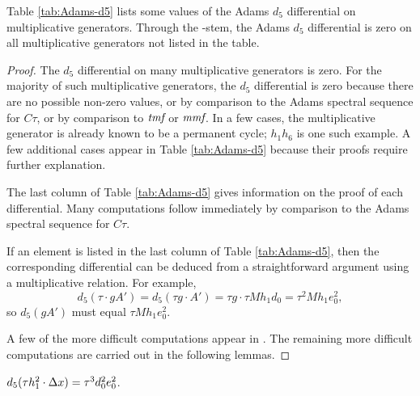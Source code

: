 \begin{thm}
\label{thm:Adams-d5}
Table \ref{tab:Adams-d5} lists some values of the
Adams $d_5$ differential on multiplicative generators.
Through the -stem, 
the Adams $d_5$ differential is zero on all multiplicative
generators not listed in the table.
\end{thm}

\begin{proof}
The $d_5$ differential on many multiplicative generators is zero.
For the majority of such multiplicative generators,
the $d_5$ differential is zero
because there are no possible non-zero
values, or by comparison to the Adams spectral sequence for $C\tau$,
or by comparison to $\textit{tmf}$ or $\textit{mmf}$.
In a few cases, the multiplicative generator
is already known to be a permanent cycle; $h_1 h_6$ is one
such example.
A few additional cases appear
in Table \ref{tab:Adams-d5} because their proofs require further
explanation.

The last column of Table \ref{tab:Adams-d5} gives information on the
proof of each differential.
Many computations follow immediately by comparison to
the Adams spectral sequence for $C\tau$.

If an element is listed in the last column of Table \ref{tab:Adams-d5}, 
then the corresponding differential can be deduced from a straightforward
argument using a multiplicative relation.  For example, 
\[
d_5( \tau \cdot g A' ) =
d_5( \tau g \cdot A') =
\tau g \cdot \tau M h_1 d_0 = \tau^2 M h_1 e_0^2,
\]
so $d_5(g A')$ must equal $\tau M h_1 e_0^2$.

A few of the more difficult computations appear in \cite{BIX}.
The remaining more difficult computations are carried out in the
following lemmas.
\end{proof}




\begin{lemma}
\label{lem:d5-th1^2.Dx}
$d_5(\tau h_1^2 \cdot \Delta x) = \tau^3 d_0^2 e_0^2$.
\end{lemma}

